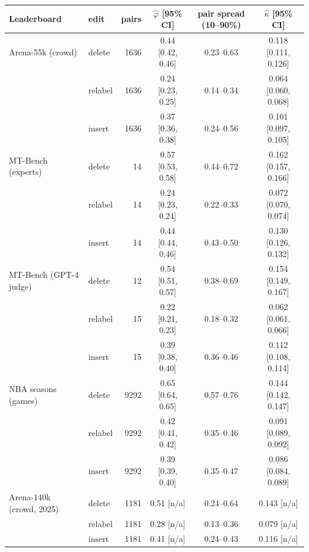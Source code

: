 \begin{tabular}{llrccc}\toprule
Leaderboard & edit & pairs & $\hat\varphi$ [95\% CI] & pair spread (10--90\%) & $\hat\kappa$ [95\% CI] \\\midrule
Arena-55k (crowd) & delete & 1636 & 0.44 [0.42, 0.46] & 0.23--0.63 & 0.118 [0.111, 0.126] \\
 & relabel & 1636 & 0.24 [0.23, 0.25] & 0.14--0.34 & 0.064 [0.060, 0.068] \\
 & insert & 1636 & 0.37 [0.36, 0.38] & 0.24--0.56 & 0.101 [0.097, 0.105] \\
\addlinespace
MT-Bench (experts) & delete & 14 & 0.57 [0.53, 0.58] & 0.44--0.72 & 0.162 [0.157, 0.166] \\
 & relabel & 14 & 0.24 [0.23, 0.24] & 0.22--0.33 & 0.072 [0.070, 0.074] \\
 & insert & 14 & 0.44 [0.44, 0.46] & 0.43--0.50 & 0.130 [0.126, 0.132] \\
\addlinespace
MT-Bench (GPT-4 judge) & delete & 12 & 0.54 [0.51, 0.57] & 0.38--0.69 & 0.154 [0.149, 0.167] \\
 & relabel & 15 & 0.22 [0.21, 0.23] & 0.18--0.32 & 0.062 [0.061, 0.066] \\
 & insert & 15 & 0.39 [0.38, 0.40] & 0.36--0.46 & 0.112 [0.108, 0.114] \\
\addlinespace
NBA seasons (games) & delete & 9292 & 0.65 [0.64, 0.65] & 0.57--0.76 & 0.144 [0.142, 0.147] \\
 & relabel & 9292 & 0.42 [0.41, 0.42] & 0.35--0.46 & 0.091 [0.089, 0.092] \\
 & insert & 9292 & 0.39 [0.39, 0.40] & 0.35--0.47 & 0.086 [0.084, 0.089] \\
\addlinespace
Arena-140k (crowd, 2025) & delete & 1181 & 0.51 [n/a] & 0.24--0.64 & 0.143 [n/a] \\
 & relabel & 1181 & 0.28 [n/a] & 0.13--0.36 & 0.079 [n/a] \\
 & insert & 1181 & 0.41 [n/a] & 0.24--0.43 & 0.116 [n/a] \\
\bottomrule\end{tabular}
